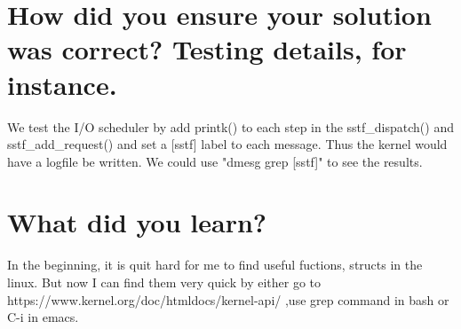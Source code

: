 \documentclass[12pt,letterpaper]{article}
\begin{document}
\section{How did you ensure your solution was correct? Testing details, for instance.}
\indent We test the I/O scheduler by add printk() to each step in the  sstf\_dispatch() and sstf\_add\_request() and set a [sstf] label to each message. Thus the kernel would have a logfile be written. We could use  "dmesg \textbar grep [sstf]" to see the results.

\section{What did you learn?}
\indent In the beginning, it is quit hard for me to find useful fuctions, structs in the linux. But now I can find them very quick by either go to https://www.kernel.org/doc/htmldocs/kernel-api/ ,use grep command in bash or C-i in emacs.
\end{document}
